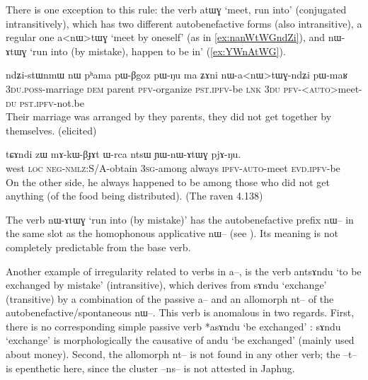 \documentclass[oldfontcommands,oneside,a4paper,11pt]{article}
\newcommand{\ipa}[1]{{\phon \mbox{#1}}} %
\begin{document}
 
 There is one exception to this rule: the verb \ipa{atɯɣ} `meet, run into' (conjugated intransitively), which has two different autobenefactive forms (also intransitive), a regular one \ipa{a<nɯ>tɯɣ} `meet by oneself' (as in \ref{ex:nanWtWGndZi}), and  \ipa{nɯ-ɤtɯɣ}  `run into (by mistake), happen to be in'   (\ref{ex:YWnAtWG}).
 
 \begin{exe}
\ex \label{ex:nanWtWGndZi}
\gll 
\ipa{ndʑi-stɯnmɯ}  	\ipa{nɯ}  	\ipa{pʰama}  	\ipa{pɯ-βgoz}  	\ipa{pɯ-ŋu}  	\ipa{ma}  	\ipa{ʑɤni}  	\ipa{nɯ-a<nɯ>tɯɣ-ndʑi}  	\ipa{pɯ-maʁ}  \\
\textsc{3du.poss}-marriage \textsc{dem} parent \textsc{pfv}-organize \textsc{pst.ipfv}-be \textsc{lnk} \textsc{3du} \textsc{pfv}-<\textsc{auto}>meet-\textsc{du}  \textsc{pst.ipfv}-not.be \\
\glt Their marriage was arranged by they parents, they did not get together by themselves. (elicited)
\end{exe}

 \begin{exe}
\ex \label{ex:YWnAtWG}
\gll 
\ipa{tɕɤndi}  	\ipa{zɯ}  	\ipa{mɤ-kɯ-βɟɤt}  	\ipa{ɯ-rca}  	\ipa{ntsɯ}  	\ipa{ɲɯ-nɯ-ɤtɯɣ}  	\ipa{pjɤ-ŋu.}  \\
west \textsc{loc} \textsc{neg-nmlz}:S/A-obtain \textsc{3sg}-among always \textsc{ipfv-auto}-meet \textsc{evd.ipfv}-be \\
\glt On the other side, he   always happened to be among those who did not get anything (of the food being distributed). (The raven 4.138)
\end{exe}

The verb \ipa{nɯ-ɤtɯɣ}  `run into (by mistake)'  has the autobenefactive prefix \ipa{nɯ--} in the same slot as the homophonous applicative \ipa{nɯ--} (see \citealt{jacques13tropative}). Its meaning   is not completely predictable from the base verb.

Another example of irregularity related to verbs in \ipa{a--}, is the verb \ipa{antsɤndu} `to be exchanged by mistake' (intransitive), which derives from   \ipa{sɤndu} `exchange' (transitive) by a combination of the passive \ipa{a--} and an allomorph \ipa{nt--} of the autobenefactive/spontaneous \ipa{nɯ--}. This verb is anomalous in two regards. First, there is no corresponding simple passive verb *\ipa{asɤndu} `be exchanged' : \ipa{sɤndu} `exchange' is morphologically the causative of \ipa{andu} `be exchanged' (mainly used about money). Second, the allomorph \ipa{nt--} is not found in any other verb; the \ipa{--t--} is epenthetic here, since the cluster \ipa{--ns--} is not attested in Japhug.
\end{document}
